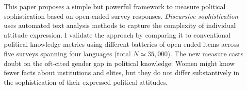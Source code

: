 This paper proposes a simple but powerful framework to measure political sophistication based on open-ended survey responses. \textit{Discursive sophistication} uses automated text analysis methods to capture the complexity of individual attitude expression. I validate the approach by comparing it to conventional political knowledge metrics using different batteries of open-ended items across five surveys spanning four languages (total $N \simeq 35,000$). The new measure casts doubt on the oft-cited gender gap in political knowledge: Women might know fewer facts about institutions and elites, but they do not differ substantively in the sophistication of their expressed political attitudes.
